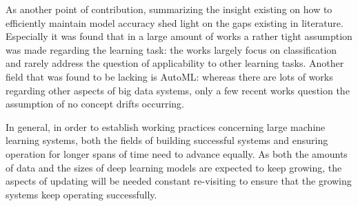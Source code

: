  
 
 As another point of contribution, summarizing the insight existing on how to efficiently maintain model accuracy shed light on the gaps existing in literature. Especially it was found that in a large amount of works a rather tight assumption was made regarding the learning task: the works largely focus on classification and rarely address the question of applicability to other learning tasks. Another field that was found to be lacking is AutoML: whereas there are lots of works regarding other aspects of big data systems, only a few recent works question the assumption of no concept drifts occurring.
 
 
 
 In general, in order to establish working practices concerning large machine learning systems, both the fields of building successful systems and ensuring operation for longer spans of time need to advance equally. As both the amounts of data and the sizes of deep learning models are expected to keep growing, the aspects of updating will be needed constant re-visiting to ensure that the growing systems keep operating successfully.
